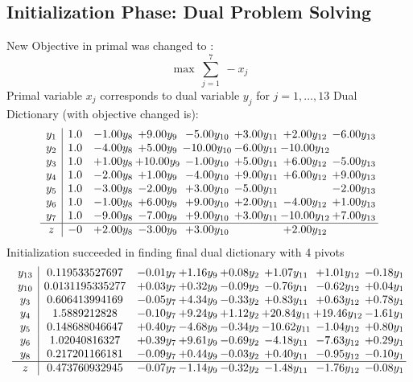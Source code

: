 \documentclass[9pt]{article}
\begin{document}
\subsection{Initialization Phase: Dual Problem Solving}
New Objective in primal was changed to : \[ \max\ \sum_{j=1}^{7}\ - x_j \] 
Primal variable $x_j$ corresponds to dual variable $y_j$ for $j = 1,\ldots,13$
Dual Dictionary (with objective changed is): 
\[\begin{array}{c| c c@{\hskip 2pt} c@{\hskip 2pt} c@{\hskip 2pt} c@{\hskip 2pt} c@{\hskip 2pt} c@{\hskip 2pt} }
 y_{1}   &  1.0 & -1.00 y_{8} & +  9.00 y_{9} & -5.00 y_{10} & +  3.00 y_{11} & +  2.00 y_{12} & -6.00 y_{13}\\
 y_{2}   &  1.0 & -4.00 y_{8} & +  5.00 y_{9} & -10.00 y_{10} & -6.00 y_{11} & -10.00 y_{12} &   \\
 y_{3}   &  1.0 & +  1.00 y_{8} & + 10.00 y_{9} & -1.00 y_{10} & +  5.00 y_{11} & +  6.00 y_{12} & -5.00 y_{13}\\
 y_{4}   &  1.0 & -2.00 y_{8} & +  1.00 y_{9} & -4.00 y_{10} & +  9.00 y_{11} & +  6.00 y_{12} & +  9.00 y_{13}\\
 y_{5}   &  1.0 & -3.00 y_{8} & -2.00 y_{9} & +  3.00 y_{10} & -5.00 y_{11} &   & -2.00 y_{13}\\
 y_{6}   &  1.0 & -1.00 y_{8} & +  6.00 y_{9} & +  9.00 y_{10} & +  2.00 y_{11} & -4.00 y_{12} & +  1.00 y_{13}\\
 y_{7}   &  1.0 & -9.00 y_{8} & -7.00 y_{9} & +  9.00 y_{10} & +  3.00 y_{11} & -10.00 y_{12} & +  7.00 y_{13}\\
\hline
z    &  -0 & +  2.00 y_{8} & -3.00 y_{9} & +  3.00 y_{10} &   & +  2.00 y_{12} &   \\
\end{array}\]
Initialization succeeded in finding final dual dictionary with 4 pivots
\[\begin{array}{c| c c@{\hskip 2pt} c@{\hskip 2pt} c@{\hskip 2pt} c@{\hskip 2pt} c@{\hskip 2pt} c@{\hskip 2pt} }
 y_{13}   &  0.119533527697 & -0.01 y_{7} & +  1.16 y_{9} & +  0.08 y_{2} & +  1.07 y_{11} & +  1.01 y_{12} & -0.18 y_{1}\\
 y_{10}   &  0.0131195335277 & +  0.03 y_{7} & +  0.32 y_{9} & -0.09 y_{2} & -0.76 y_{11} & -0.62 y_{12} & +  0.04 y_{1}\\
 y_{3}   &  0.606413994169 & -0.05 y_{7} & +  4.34 y_{9} & -0.33 y_{2} & +  0.83 y_{11} & +  0.63 y_{12} & +  0.78 y_{1}\\
 y_{4}   &  1.5889212828 & -0.10 y_{7} & +  9.24 y_{9} & +  1.12 y_{2} & + 20.84 y_{11} & + 19.46 y_{12} & -1.61 y_{1}\\
 y_{5}   &  0.148688046647 & +  0.40 y_{7} & -4.68 y_{9} & -0.34 y_{2} & -10.62 y_{11} & -1.04 y_{12} & +  0.80 y_{1}\\
 y_{6}   &  1.02040816327 & +  0.39 y_{7} & +  9.61 y_{9} & -0.69 y_{2} & -4.18 y_{11} & -7.63 y_{12} & +  0.29 y_{1}\\
 y_{8}   &  0.217201166181 & -0.09 y_{7} & +  0.44 y_{9} & -0.03 y_{2} & +  0.40 y_{11} & -0.95 y_{12} & -0.10 y_{1}\\
\hline
z    &  0.473760932945 & -0.07 y_{7} & -1.14 y_{9} & -0.32 y_{2} & -1.48 y_{11} & -1.76 y_{12} & -0.08 y_{1}\\
\end{array}\]
\end{document}
